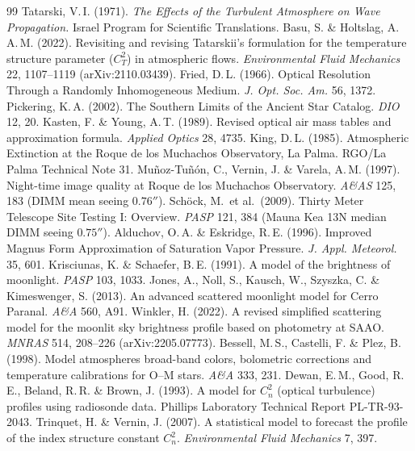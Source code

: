 \documentclass[11pt]{article}
\begin{document}
\begin{thebibliography}{99}
\small
{} Tatarski, V.\,I. (1971). \emph{The Effects of the Turbulent Atmosphere on Wave Propagation.} Israel Program for Scientific Translations.
 Basu, S. \& Holtslag, A.\,A.\,M. (2022). Revisiting and revising Tatarskii's formulation for the temperature structure parameter ($C_T^2$) in atmospheric flows. \emph{Environmental Fluid Mechanics} 22, 1107--1119 (arXiv:2110.03439).
 Fried, D.\,L. (1966). Optical Resolution Through a Randomly Inhomogeneous Medium. \emph{J. Opt. Soc. Am.} 56, 1372.
 Pickering, K.\,A. (2002). The Southern Limits of the Ancient Star Catalog. \emph{DIO} 12, 20.
 Kasten, F. \& Young, A.\,T. (1989). Revised optical air mass tables and approximation formula. \emph{Applied Optics} 28, 4735.
 King, D.\,L. (1985). Atmospheric Extinction at the Roque de los Muchachos Observatory, La Palma. RGO/La Palma Technical Note 31.
 Mu\~noz-Tu\~n\'on, C., Vernin, J. \& Varela, A.\,M. (1997). Night-time image quality at Roque de los Muchachos Observatory. \emph{A\&AS} 125, 183 (DIMM mean seeing $0.76''$).
 Sch\"ock, M.\ et al.\ (2009). Thirty Meter Telescope Site Testing I: Overview. \emph{PASP} 121, 384 (Mauna Kea 13N median DIMM seeing $0.75''$).
 Alduchov, O.\,A. \& Eskridge, R.\,E. (1996). Improved Magnus Form Approximation of Saturation Vapor Pressure. \emph{J. Appl. Meteorol.} 35, 601.
 Krisciunas, K. \& Schaefer, B.\,E. (1991). A model of the brightness of moonlight. \emph{PASP} 103, 1033.
 Jones, A., Noll, S., Kausch, W., Szyszka, C. \& Kimeswenger, S. (2013). An advanced scattered moonlight model for Cerro Paranal. \emph{A\&A} 560, A91.
 Winkler, H. (2022). A revised simplified scattering model for the moonlit sky brightness profile based on photometry at SAAO. \emph{MNRAS} 514, 208--226 (arXiv:2205.07773).
 Bessell, M.\,S., Castelli, F. \& Plez, B. (1998). Model atmospheres broad-band colors, bolometric corrections and temperature calibrations for O--M stars. \emph{A\&A} 333, 231.
 Dewan, E.\,M., Good, R.\,E., Beland, R.\,R. \& Brown, J. (1993). A model for $C_n^2$ (optical turbulence) profiles using radiosonde data. Phillips Laboratory Technical Report PL-TR-93-2043.
 Trinquet, H. \& Vernin, J. (2007). A statistical model to forecast the profile of the index structure constant $C_n^2$. \emph{Environmental Fluid Mechanics} 7, 397.

\end{thebibliography}
\end{document}
